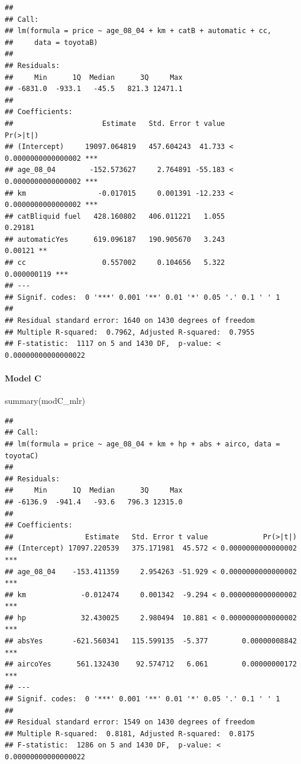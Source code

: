 \documentclass[
]{article}
\newenvironment{Shaded}{\begin{snugshade}}{\end{snugshade}}
\newcommand{\FunctionTok}[1]{\textcolor[rgb]{0.00,0.00,0.00}{#1}}
\newcommand{\NormalTok}[1]{#1}
\begin{document}
\begin{verbatim}
## 
## Call:
## lm(formula = price ~ age_08_04 + km + catB + automatic + cc, 
##     data = toyotaB)
## 
## Residuals:
##     Min      1Q  Median      3Q     Max 
## -6831.0  -933.1   -45.5   821.3 12471.1 
## 
## Coefficients:
##                     Estimate   Std. Error t value             Pr(>|t|)    
## (Intercept)     19097.064819   457.604243  41.733 < 0.0000000000000002 ***
## age_08_04        -152.573627     2.764891 -55.183 < 0.0000000000000002 ***
## km                 -0.017015     0.001391 -12.233 < 0.0000000000000002 ***
## catBliquid fuel   428.160802   406.011221   1.055              0.29181    
## automaticYes      619.096187   190.905670   3.243              0.00121 ** 
## cc                  0.557002     0.104656   5.322          0.000000119 ***
## ---
## Signif. codes:  0 '***' 0.001 '**' 0.01 '*' 0.05 '.' 0.1 ' ' 1
## 
## Residual standard error: 1640 on 1430 degrees of freedom
## Multiple R-squared:  0.7962, Adjusted R-squared:  0.7955 
## F-statistic:  1117 on 5 and 1430 DF,  p-value: < 0.00000000000000022
\end{verbatim}

\hypertarget{model-c-7}{%
\paragraph{Model C}\label{model-c-7}}

\begin{Shaded}
\begin{Highlighting}[]
\FunctionTok{summary}\NormalTok{(modC\_mlr)}
\end{Highlighting}
\end{Shaded}

\begin{verbatim}
## 
## Call:
## lm(formula = price ~ age_08_04 + km + hp + abs + airco, data = toyotaC)
## 
## Residuals:
##     Min      1Q  Median      3Q     Max 
## -6136.9  -941.4   -93.6   796.3 12315.0 
## 
## Coefficients:
##                 Estimate   Std. Error t value             Pr(>|t|)    
## (Intercept) 17097.220539   375.171981  45.572 < 0.0000000000000002 ***
## age_08_04    -153.411359     2.954263 -51.929 < 0.0000000000000002 ***
## km             -0.012474     0.001342  -9.294 < 0.0000000000000002 ***
## hp             32.430025     2.980494  10.881 < 0.0000000000000002 ***
## absYes       -621.560341   115.599135  -5.377        0.00000008842 ***
## aircoYes      561.132430    92.574712   6.061        0.00000000172 ***
## ---
## Signif. codes:  0 '***' 0.001 '**' 0.01 '*' 0.05 '.' 0.1 ' ' 1
## 
## Residual standard error: 1549 on 1430 degrees of freedom
## Multiple R-squared:  0.8181, Adjusted R-squared:  0.8175 
## F-statistic:  1286 on 5 and 1430 DF,  p-value: < 0.00000000000000022
\end{verbatim}
\end{document}
